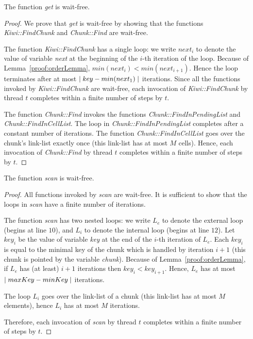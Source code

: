 \begin{lemma}
\label{proof:aaaaaaaa}
The function \emph{get} is wait-free.
\end{lemma}
\begin{proof}
We prove that \emph{get} is wait-free by showing that the functions \emph{Kiwi::FindChunk} and \emph{Chunk::Find} are wait-free.

The function \emph{Kiwi::FindChunk} has a single loop: we write ${next}_i$ to denote the value of variable \emph{next} at the beginning of the $i$-th iteration of the loop.
%
Because of Lemma~\ref{proof:orderLemma}, $min({next}_i) < min({next}_{i+1})$.
Hence the loop terminates after at most $\mid{key - min({next}_1)}\mid$ iterations.
%
Since all the functions invoked by \emph{Kiwi::FindChunk} are wait-free, each invocation of \emph{Kiwi::FindChunk} by thread $t$ completes within a finite number of steps by $t$.

The function \emph{Chunk::Find} invokes the functions \emph{Chunk::FindInPendingList} and \emph{Chunk::FindInCellList}.
The loop in \emph{Chunk::FindInPendingList} completes after a constant number of iterations.
The function \emph{Chunk::FindInCellList} goes over the chunk's link-list exactly once (this link-list has at most $M$ cells).
Hence, each invocation of \emph{Chunk::Find} by thread $t$ completes within a finite number of steps by $t$.

\end{proof}



\begin{lemma}
\label{proof:aaaaaaaa}
The function \emph{scan} is wait-free.
\end{lemma}

\begin{proof}
All functions invoked by \emph{scan} are wait-free.
It is sufficient to show that the loops in  \emph{scan} have
a finite number of iterations.

The function \emph{scan} has two nested loops:
we write $L_e$ to denote the external loop (begins at line $10$), and $L_i$ to denote the internal loop (begins at line $12$).
Let ${key}_i$ be the value of variable \emph{key} at the end of the $i$-th iteration of $L_e$.
Each ${key}_i$ is equal to the minimal key of the chunk which is handled by iteration $i+1$
(this chunk is pointed by the variable \emph{chunk}).
Because of Lemma~\ref{proof:orderLemma}, if $L_e$ has (at least) $i+1$ iterations then ${key}_i < {key}_{i+1}$.
Hence, $L_e$ has at most  $\mid{maxKey - minKey}\mid$ iterations.

The loop $L_i$ goes over the link-list of a chunk (this link-list has at most $M$ elements), hence $L_i$ has at most $M$ iterations.

Therefore, each invocation of \emph{scan} by thread $t$ completes within a finite number of steps by $t$.

\end{proof}





